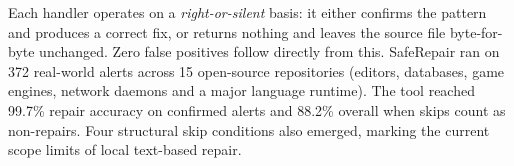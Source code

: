 Each handler operates on a \textit{right-or-silent} basis: it either confirms the pattern and produces a correct fix, or returns nothing and leaves the source file byte-for-byte unchanged. Zero false positives follow directly from this. SafeRepair ran on 372 real-world alerts across 15 open-source repositories (editors, databases, game engines, network daemons and a major language runtime). The tool reached 99.7\% repair accuracy on confirmed alerts and 88.2\% overall when skips count as non-repairs. Four structural skip conditions also emerged, marking the current scope limits of local text-based repair.

